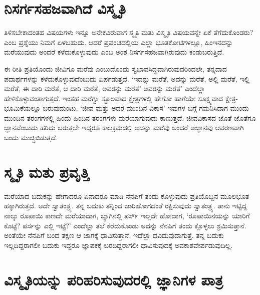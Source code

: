 \section*{ನಿಸರ್ಗಸಹಜವಾಗಿದೆ ವಿಸ್ಮೃತಿ}

ತಿಳಿಸಬೇಕಾದಂತಹ ವಿಷಯಗಳು ಇನ್ನೂ ಅನೇಕವಿರುವಾಗ ಸ್ಮೃತಿ ಮತು ವಿಸ್ಮೃತಿ ವಿಷಯವನ್ನೇ ಏಕೆ ತೆಗೆದುಕೊಂಡರು? ಎಂಬ ಪ್ರಶ್ನೆಯು ನಿಮಗೆ ಏಳಬಹುದು. ಆದರೆ ಪ್ರಪಂಚದಲ್ಲಿಯ ಎಲ್ಲಾ ಭೂತಕೋಟಿಗಳಲ್ಲೂ, ಹಿಂಇನದನ್ನು ಮರೆಯುವುದು ಅಂದರೆ ಕಳೆದುಕೊಳ್ಳುವುದು ಎಂಬ ಅಂಶ ನಿಸರ್ಗಸಹಜವಾಗಿರುವುದು ಕಂಡುಬರುತ್ತಿದೆ.

ಈ ರೀತಿ ಪ್ರತಿಯೊಂದು ಜೀವಿಗೂ ಮರೆವು ಎಂಬುದೊಂದು ಸ್ವಭಾವಸಿದ್ಧವಾಗಿರುವುದರಿಂದಲೇ, ತನ್ನದಾದ ಪದಾರ್ಥಗಳನ್ನು ಕಳೆದುಕೊಳ್ಳುವುದೆಂಬುದು ಏರ್ಪಡುತ್ತದೆ. `ಇದನ್ನು ಮರೆತೆ, ಅದನ್ನು ಮರೆತೆ, ಅಲ್ಲಿ ಮರೆತೆ, ಇಲ್ಲಿ ಮರೆತೆ, ಈ ದಾರಿ ಮರೆತೆ, ಆ ದಾರಿ ಮರೆತೆ, ಅವರನ್ನು ಮರೆತೆ' ಅವರನ್ನು ಮರೆತೆ' ಎಂದೆಲ್ಲಾ ಹೇಳಿಕೊಳ್ಳುವಂತಾಗುತ್ತದೆ. ಇಂತಹ ಮರೆಗ್ವು ಸ್ಥೂಲವಾದ ಕ್ಷೇತ್ರಗಳಲ್ಲಿ ಹೇಗೋ ಹಾಗೆಯೇ ಸೂಕ್ಷ್ಮವಾದ ಕ್ಷೇತ್ರ-ಭೂಮಿಕೆಯಲ್ಲೂ ಬರುವುದುಂಟು. `ಜೀವ ಮತ್ತು ಅದರ ಮುಂದಿನ ವಿಕಾಸ' ಇವುಗಳ ಬಗ್ಗೆ ಗಮನಿಸಿದಾಗ ಮುಂದು ಮುಂದಿನ ತರಂಗಗಳಲ್ಲಿ ಹಿಂದು ಹಿಂದಿನ ತರಂಗಗಳು ಮರೆಯಾಗುವುದು ಕಾಣುತ್ತದೆ. ಜೀವವಿಕಾಸದ ಜೊತೆ ಜೊತೆಗೂ ಜ್ಞಾನವೆಂಬುದು ಹರಿದು ಬರುತ್ತಲೇ ಇದ್ದರೂ ಕಾಲಕ್ರಮದಲ್ಲಿ ಅದನ್ನು ಮರೆವು ಅಂದರೆ ಅಜ್ಞಾನವು ಆವರಣವಾಗಿ ಬಂದು ಮುಚ್ಚಿಬಿಡುತ್ತದೆ. 

\section*{ಸ್ಮೃತಿ ಮತು ಪ್ರವೃತ್ತಿ}

ಮರೆಯಾದ ಬದುಕನ್ನು ಹೇಗಾದರೂ ಏನಾದರೂ ಮಾಡಿ ನೆನಪಿಗೆ ತಂದು ಕೊಳ್ಳುವುದು ಪ್ರತಿಯೊಬ್ಬನ ಮೂಲಭೂತ ಹಕ್ಕಾಗಿರುತ್ತದೆ. ಅದೇ ಸ್ವಾತಂತ್ರ್ಯ. ತನ್ನ ಬದುಕು ತನ್ನಿಂದ ಜಾರಿಹೋಗದಂತೆ ರಕ್ಷಿಸುವುದು ಸ್ವಾತಂತ್ರ್ಯ. ತಾನು ಇಟ್ಟಿದ್ದ ನಾಲ್ಕು ರೂಪಾಯಿ ಕಾಣದೇ ಮರೆಯಾದಾಗ, ಬ್ಯಾಗಿನಲ್ಲಿ ಪರ್ಸ್ ಇಲ್ಲದೇ ಹೋದಾಗ, `ರೂಪಾಯಿನಯನ್ನು ಯಾರಿಗೆ ಕೊಟ್ಟೆ? ಪರ್ಸನ್ನು ಎಲ್ಲಿ ಇಟ್ಟೆ?' ಎಂದೆಲ್ಲಾ ತಲೆ ಕೆರೆದುಕೊಂಡು ಅದನ್ನು ನೆನಪಿಗೆ ತಂದು ಕ್ಲೊಳ್ಳಲು ಶ್ರಮಿಸುತ್ತಾನೆ. ಅಂತೆಯೇ ನೆನಪಿಗೆ ಬಂದ ತಕ್ಷಣ ಆ ಜಾಗಕ್ಕೆ ಧಾವಿಸುತ್ತಾನೆ. ಇದೆಲ್ಲಾ ಧವಿದುವುದಾಗುತ್ತೆ. ತನ್ನ ಬದುಕು ಇಲ್ಲದಿದ್ದರಾಗಲೀ ಬದುಕು ಇದ್ದರೂ ಜ್ಞಾಪಕಕ್ಕೆ ಬರದಿದ್ದರಾಗಲೀ ಧಾವಿಸುವುದಕ್ಕೆ ಅವಕಾಶವೇರ್ಪಡುವುದಿಲ್ಲ.

\section*{ವಿಸ್ಮೃತಿಯನ್ನು ಪರಿಹರಿಸುವುದರಲ್ಲಿ ಜ್ಞಾನಿಗಳ ಪಾತ್ರ}

